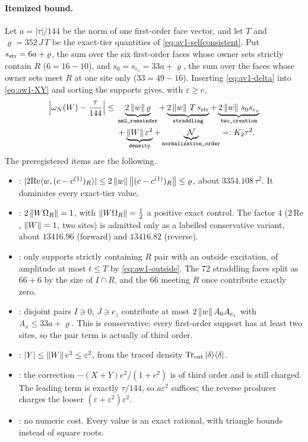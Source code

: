 \paragraph{Itemized bound.}
Let $a=|\tau|/144$ be the norm of one first-order face vector, and let $T$ and
$\varrho=352\,J\,T$ be the exact-tier quantities of
\eqref{eq:av1-selfconsistent}. Put $s_{\rm str}=6a+\varrho$, the sum over the
six first-order faces whose owner sets strictly contain $R$ ($6=16-10$), and
$s_0=s_{e_z}=33a+\varrho$, the sum over the faces whose owner sets meet $R$
at one site only ($33=49-16$). Inserting \eqref{eq:av1-delta} into
\eqref{eq:aw1-XY} and sorting the supports gives, with $\varepsilon\ge e$,
\begin{equation}
 \begin{aligned}
 \Bigl|\omega_N(W)-\frac{\tau}{144}\Bigr|\le{}&
 \underbrace{2\norm{w}\varrho}_{\recid{am2_remainder}}
 +\underbrace{2\norm{w}\,T\,s_{\rm str}}_{\recid{straddling}}
 +\underbrace{2\norm{w}\,s_0s_{e_z}}_{\recid{two_creation}}\\
 &+\underbrace{\norm{W}\varepsilon^2}_{\recid{density}}
 +\underbrace{\mathcal N}_{\recid{normalization_order}}
 =:K_2\tau^2 .
 \end{aligned}
 \label{eq:aw1-k2}
\end{equation}
The preregistered items are the following.
\begin{itemize}
\item {}: $|2\mathrm{Re}\langle w,(c-c^{(1)})_R\rangle|
\le2\left\lVert w\right\rVert\left\lVert(c-c^{(1)})_R\right\rVert\le\varrho$, about $3354.108\,\tau^2$. It
dominates every exact-tier value.
\item {}: $2\left\lVert W\Omega_R\right\rVert=1$, with
$\left\lVert W\Omega_R\right\rVert=\tfrac12$ a positive exact control. The factor $4$
($2\,\mathrm{Re}$, $\left\lVert W\right\rVert=1$, two sites) is admitted only as a labelled
conservative variant, about $13416.96$ (forward) and $13416.82$ (reverse).
\item {}: only supports strictly containing $R$ pair with an
outside excitation, of amplitude at most $t\le T$ by \eqref{eq:aw1-outside}.
The 72 straddling faces split as $66+6$ by the size of $I\cap R$, and the 66
meeting $R$ once contribute exactly zero.
\item {}: disjoint pairs $I\ni0$, $J\ni e_z$ contribute at
most $2\left\lVert w\right\rVert A_0A_{e_z}$ with $A_x\le33a+\varrho$. This is conservative:
every first-order support has at least two sites, so the pair term is
actually of third order.
\item {}: $|Y|\le\left\lVert W\right\rVert e^2\le\varepsilon^2$, from the traced
density $\operatorname{Tr}_{\rm out}|\delta\rangle\langle\delta|$.
\item {}: the correction
$-(X+Y)e^2/(1+e^2)$ is of third order and is still charged. The leading term
is exactly $\tau/144$, so $a\varepsilon^2$ suffices; the reverse producer
charges the looser $(\varepsilon+\varepsilon^2)\varepsilon^2$.
\item {}: no numeric cost. Every value is an exact rational,
with triangle bounds instead of square roots.
\end{itemize}
